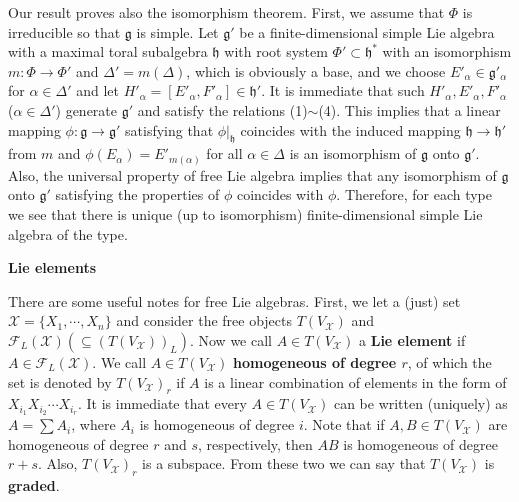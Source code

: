 \documentclass{article}
\newcommand{\lie}[1]{\mathfrak{#1}}
\begin{document}
Our result proves also the isomorphism theorem.
First, we assume that $\Phi$ is irreducible so that $\lie{g}$ is simple.
Let $\lie{g}'$ be a finite-dimensional simple Lie algebra with a maximal toral subalgebra $\lie{h}$ with root system $\Phi' \subset \lie{h}^*$ with an isomorphism $m : \Phi \to \Phi'$ and $\Delta' = m(\Delta)$, which is obviously a base, and we choose $E'_\alpha \in \lie{g}'_\alpha$ for $\alpha \in \Delta'$ and let $H'_\alpha = [E'_\alpha, F'_\alpha] \in \lie{h}'$.
It is immediate that such $H'_\alpha, E'_\alpha, F'_\alpha$ ($\alpha \in \Delta'$) generate $\lie{g}'$ and satisfy the relations (1)$\sim$(4).
This implies that a linear mapping $\phi : \lie{g} \to \lie{g}'$ satisfying that $\phi|_\lie{h}$ coincides with the induced mapping $\lie{h} \to \lie{h}'$ from $m$ and $\phi(E_\alpha) = E'_{m(\alpha)}$ for all $\alpha \in \Delta$ is an isomorphism of $\lie{g}$ onto $\lie{g}'$.
Also, the universal property of free Lie algebra implies that any isomorphism of $\lie{g}$ onto $\lie{g}'$ satisfying the properties of $\phi$ coincides with $\phi$.
Therefore, for each type we see that there is unique (up to isomorphism) finite-dimensional simple Lie algebra of the type.

\newpage

\textbf{Lie elements}

There are some useful notes for free Lie algebras.
First, we let a (just) set $\mathcal{X} = \{X_1, \cdots, X_n\}$ and consider the free objects $T(V_\mathcal{X})$ and $\mathcal{F}_L(\mathcal{X}) (\subseteq (T(V_\mathcal{X}))_L)$.
Now we call $A \in T(V_\mathcal{X})$ a \textbf{Lie element} if $A \in \mathcal{F}_L(\mathcal{X})$.
We call $A \in T(V_\mathcal{X})$ \textbf{homogeneous of degree $r$}, of which the set is denoted by $T(V_\mathcal{X})_r$ if $A$ is a linear combination of elements in the form of $X_{i_1} X_{i_2} \cdots X_{i_r}$.
It is immediate that every $A \in T(V_\mathcal{X})$ can be written (uniquely) as $A = \sum A_i$, where $A_i$ is homogeneous of degree $i$.
Note that if $A, B \in T(V_\mathcal{X})$ are homogeneous of degree $r$ and $s$, respectively, then $AB$ is homogeneous of degree $r + s$.
Also, $T(V_\mathcal{X})_r$ is a subspace.
From these two we can say that $T(V_\mathcal{X})$ is \textbf{graded}.
\end{document}
